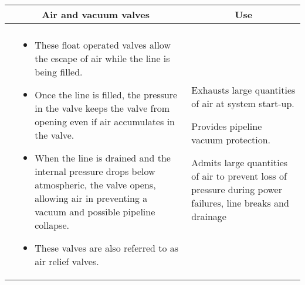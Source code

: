 \newpage
\thispagestyle{empty}
\begin{landscape}
\begin{table}[h!]
  \centering
  \begin{tabular}{| m{7cm} m{10cm} | m{7cm} | }
    \hline
\multicolumn{2}{c}{\scriptsize{Air and vacuum valves}} & \multicolumn{1}{c}{\scriptsize{Use}} \\ \hline
    \begin{minipage}{.5\textwidth}
    \begin{center}
    \hspace{0.5cm}
     \texttt{[image: AirVacuumValve1]}\\
     \end{center}
    \end{minipage}
    &
  \scriptsize{\begin{itemize}[topsep=5pt, partopsep=0pt]
  \item These float operated valves allow the escape of air while the line is being filled. \item Once the line is filled, the pressure in the valve keeps the valve from opening even if air accumulates in the valve. \item When the line is drained and the internal pressure drops below atmospheric, the valve opens, allowing air in preventing a vacuum and possible pipeline collapse. \item These valves are also referred to as air relief valves.
  \end{itemize}}  
    &
        \vspace{0.4cm}
      \begin{itemize}[leftmargin=*]
      \scriptsize{
        \item Exhausts large quantities of air at system start-up. \item Provides pipeline vacuum protection. \item Admits large quantities of air to prevent loss of pressure during power failures, line breaks and drainage}
      \end{itemize}
  

\end{tabular}
\end{table}
\end{landscape}

